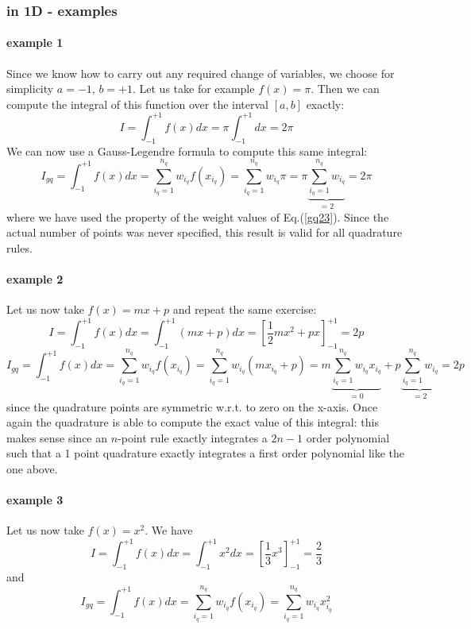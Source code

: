 \subsubsection{in 1D - examples}

\paragraph{example 1}

Since we know how to carry out any required change of variables, we choose for simplicity 
$a=-1$, $b=+1$.
Let us take for example $f(x)=\pi$. Then we can compute the integral of this function 
over the interval $[a,b]$ exactly:
\[
I=\int_{-1}^{+1} f(x) dx = \pi \int_{-1}^{+1}dx  = 2 \pi
\]
We can now use a Gauss-Legendre formula to compute this same integral:
\[
I_{gq}=\int_{-1}^{+1} f(x) dx 
= \sum_{i_q=1}^{n_q} w_{i_q} f(x_{i_q}) 
= \sum_{i_q=1}^{n_q} w_{i_q} \pi
= \pi \underbrace{\sum_{i_q=1}^{n_q} w_{i_q} }_{=2}
= 2 \pi
\]
where we have used the property of the weight values of Eq.(\ref{gq23}).
Since the actual number of points was never specified, this result is valid for all 
quadrature rules.


\paragraph{example 2}

Let us now take $f(x)=m x+ p$ and repeat the same exercise:
\[
I=\int_{-1}^{+1} f(x) dx = \int_{-1}^{+1} (mx+p) dx  =  [\frac{1}{2} m x^2 + p x ]_{-1}^{+1} =2p
\]
\[
I_{gq}=\int_{-1}^{+1} f(x) dx 
\!= \sum_{i_q=1}^{n_q} w_{i_q} f(x_{i_q}) 
\!= \sum_{i_q=1}^{n_q} w_{i_q} (m x_{i_q} + p)  
\!= m \underbrace{\sum_{i_q=1}^{n_q} w_{i_q} x_{i_q}}_{=0}  + p \underbrace{\sum_{i_q=1}^{n_q} w_{i_q}}_{=2}  = 2p
\]
since the quadrature points are symmetric w.r.t. to zero on the x-axis.
Once again the quadrature is able to compute the exact value of this integral: this makes sense since 
an $n$-point rule exactly integrates a $2n-1$ order polynomial such that a 1 point quadrature exactly 
integrates a first order polynomial like the one above.



\paragraph{example 3}

Let us now take $f(x)=x^2$. We have 
\[
I=\int_{-1}^{+1} f(x) dx = \int_{-1}^{+1} x^2 dx  =  [\frac{1}{3}x^3 ]_{-1}^{+1} =  \frac{2}{3} 
\]
and 
\[
I_{gq}=\int_{-1}^{+1} f(x) dx 
\!= \sum_{i_q=1}^{n_q} w_{i_q} f(x_{i_q}) 
\!= \sum_{i_q=1}^{n_q} w_{i_q} x_{i_q}^2 
\]

